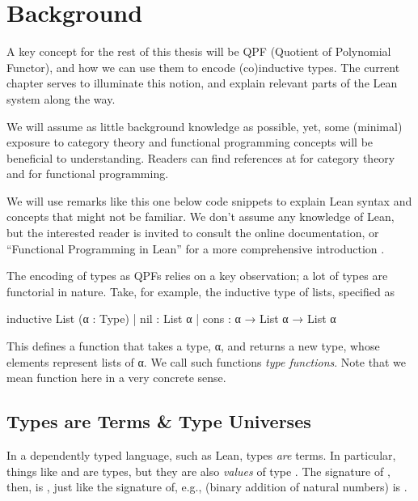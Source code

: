 \chapter{Background}
\label{ch:background}

A key concept for the rest of this thesis will be QPF (Quotient of Polynomial Functor), and how we can use them to encode (co)inductive types. The current chapter serves to illuminate this notion, and explain relevant parts of the Lean system along the way.

We will assume as little background knowledge as possible, yet, some (minimal) exposure to category theory and functional programming concepts will be beneficial to understanding. Readers can find references at \cite{awodeyCategoryTheory2010, milewskiCategoryTheoryProgrammers} for category theory and \cite{christiansenFunctionalProgrammingLean} for functional programming.


\begin{remark}
    We will use remarks like this one below code snippets to explain Lean syntax and concepts that might not be familiar. We don't assume any knowledge of Lean, but the interested reader is invited to consult the online documentation, or ``Functional Programming in Lean'' for a more comprehensive introduction
    \cite{avigadTheoremProvingLean,christiansenFunctionalProgrammingLean}.
\end{remark}



The encoding of types as QPFs relies on a key observation; a lot of types are functorial in nature.
Take, for example, the inductive type of lists, specified as
\begin{leancode}
    inductive List (α : Type)
    | nil  : List α
    | cons : α → List α → List α
\end{leancode}

This defines a function  that takes a type, α, and returns a new type, whose elements represent lists of α.
We call such functions \emph{type functions}. Note that we mean function here in a very concrete sense.

\section{Types are Terms \& Type Universes}
In a dependently typed language, such as Lean, types \emph{are} terms. In particular, things like  and  are types, but they are also \emph{values} of type \Type.
The signature of , then, is , just like the signature of, e.g.,  (binary addition of natural numbers) is .


